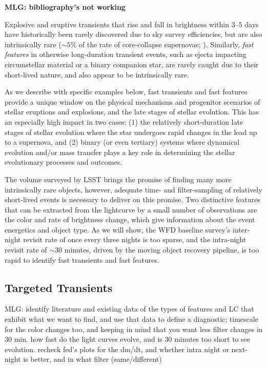 \documentclass[11pt]{article}
\begin{document}
{\bf MLG: bibliography's not working}

Explosive and eruptive transients that rise and fall in brightness within $3$--$5$ days have historically been rarely discovered due to sky survey efficiencies, but are also intrinsically rare ($\sim 5\%$ of the rate of core-collapse supernovae; \citealt{2014ApJ...794...23D}). Similarly, {\it fast features} in otherwise long-duration transient events, such as ejecta impacting circumstellar material or a binary companion star, are rarely caught due to their short-lived nature, and also appear to be intrinsically rare.

As we describe with specific examples below, fast transients and fast features provide a unique window on the physical mechanisms and progenitor scenarios of stellar eruptions and explosions, and the late stages of stellar evolution. This has an especially high impact in two cases: (1) the relatively short-duration late stages of stellar evolution where the star undergoes rapid changes in the lead up to a supernova, and (2) binary (or even tertiary) systems where dynamical evolution and/or mass transfer plays a key role in determining the stellar evolutionary processes and outcomes. 

The volume surveyed by LSST brings the promise of finding many more intrinsically rare objects, however, adequate time- and filter-sampling of relatively short-lived events is necessary to deliver on this promise. Two distinctive features that can be extracted from the lightcurve by a small number of observations are the color and rate of brightness change, which give information about the event energetics and object type. As we will show, the WFD baseline survey's inter-night revisit rate of once every three nights is too sparse, and the intra-night revisit rate of $\sim30$ minutes, driven by the moving object recovery pipeline, is too rapid to identify fast transients and fast features. 




\subsection{Targeted Transients}

MLG: identify literature and existing data of the types of features and LC that exhibit what we want to find, and use that data to define a diagnostic; timescale for the color changes too, and keeping in mind that you want less filter changes in 30 min. how fast do the light curves evolve, and is 30 minutes too short to see evolution. recheck fed's plots for the dm/dt, and whether intra night or next-night is better, and in what filter (same/different)
\end{document}
